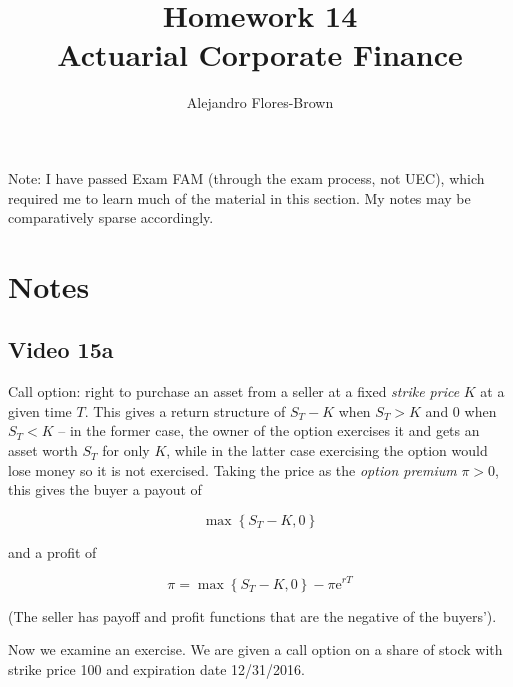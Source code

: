 \documentclass[12pt, letterpaper]{article}
\title{Homework 14 \\Actuarial Corporate Finance}
\author{Alejandro Flores-Brown}
\newcommand{\e}{\mathrm{e}}
\begin{document}
    \maketitle

    Note: I have passed Exam FAM (through the exam process, not UEC), which required me to learn much of the material in this section. My notes may be comparatively sparse accordingly.

    \section{Notes}

    \subsection{Video 15a}

    Call option: right to purchase an asset from a seller at a fixed \emph{strike price} \(K\) at a given time \(T\). This gives a return structure of \(S_T - K\) when \(S_T > K\) and \(0\) when \(S_T < K\) -- in the former case, the owner of the option exercises it and gets an asset worth \(S_T\) for only \(K\), while in the latter case exercising the option would lose money so it is not exercised. Taking the price as the \emph{option premium} \(\pi > 0\),  this gives the buyer a payout of 

    \[ \max \left\{S_T - K, 0\right\}   \]

    and a profit of

    \[ \pi = \max \left\{ S_T - K, 0 \right\} - \pi \e^{rT}    \]

    (The seller has payoff and profit functions that are the negative of the buyers').

    Now we examine an exercise. We are given a call option on a share of stock with strike price 100 and expiration date 12/31/2016.
\end{document}
